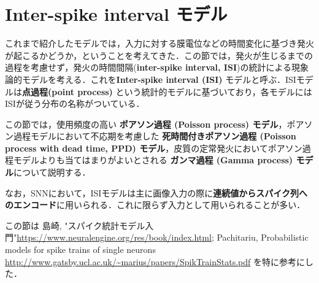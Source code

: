 \section{Inter-spike interval モデル}
これまで紹介したモデルでは，入力に対する膜電位などの時間変化に基づき発火が起こるかどうか，ということを考えてきた．この節では，発火が生じるまでの過程を考慮せず，発火の時間間隔(\textbf{inter-spike interval, ISI})の統計による現象論的モデルを考える．これを\textbf{Inter-spike interval (ISI)} モデルと呼ぶ．ISIモデルは\textbf{点過程(point process)} という統計的モデルに基づいており，各モデルにはISIが従う分布の名称がついている．

この節では，使用頻度の高い \textbf{ポアソン過程 (Poisson process) モデル}，ポアソン過程モデルにおいて不応期を考慮した \textbf{死時間付きポアソン過程 (Poisson process with dead time, PPD) モデル}，皮質の定常発火においてポアソン過程モデルよりも当てはまりがよいとされる \textbf{ガンマ過程 (Gamma process) モデル}について説明する．

なお，SNNにおいて，ISIモデルは主に画像入力の際に\textbf{連続値からスパイク列へのエンコード}に用いられる．これに限らず入力として用いられることが多い．


この節は 島崎, "スパイク統計モデル入門"\url{https://www.neuralengine.org/res/book/index.html}; Pachitariu, Probabilistic models for spike trains of single neurons \url{http://www.gatsby.ucl.ac.uk/~marius/papers/SpikTrainStats.pdf} を特に参考にした．
